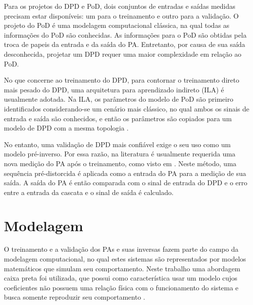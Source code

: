 
Para os projetos do DPD e PoD, dois conjuntos de entradas e saídas medidas precisam estar disponíveis: um para o treinamento e outro para a validação. O projeto do PoD é uma modelagem computacional clássica, na qual todas as informações do PoD são conhecidas. As informações para o PoD são obtidas pela troca de papeis da entrada e da saída do PA. Entretanto, por causa de sua saída desconhecida, projetar um DPD requer uma maior complexidade em relação ao PoD.

No que concerne ao treinamento do DPD, para contornar o treinamento direto mais pesado do DPD, uma arquitetura para aprendizado indireto (ILA) é usualmente adotada. Na ILA, os parâmetros do modelo de PoD são primeiro identificados considerando-se um cenário mais clássico, no qual ambos os sinais de entrada e saída são conhecidos, e então os parâmetros são copiados para um modelo de DPD com a mesma topologia \cite{changsoo_eun_new_1997}.

No entanto, uma validação de DPD mais confiável exige o seu uso como um modelo pré-inverso. Por essa razão, na literatura é usualmente requerida uma nova medição do PA após o treinamento, como visto em \cite{8891388}. Neste método, uma sequência pré-distorcida é aplicada como a entrada do PA para a medição de sua saída. A saída do PA é então comparada com o sinal de entrada do DPD e o erro entre a entrada da cascata e o sinal de saída é calculado.

\section{Modelagem} \label{sec:fundteo-model}
O treinamento e a validação dos PAs e suas inversas fazem parte do campo da modelagem computacional, no qual estes sistemas são representados por modelos matemáticos que simulam seu comportamento. Neste trabalho uma abordagem caixa preta foi utilizada, que possui como característica usar um modelo cujos coeficientes não possuem uma relação física com o funcionamento do sistema e busca somente reproduzir seu comportamento \cite{8882211}.

